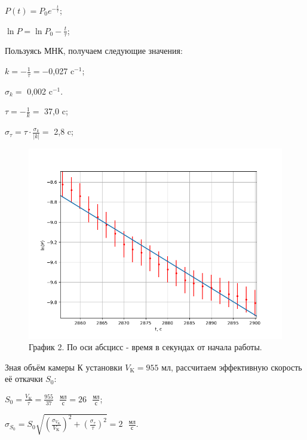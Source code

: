 \documentclass[a4paper,12pt]{article} %
\begin{document}
\begin{enumerate}
	$P(t) = P_{0}e^{-\frac{t}{\tau}}$;

	$\ln{P} = \ln{P_{0}} - \frac{t}{\tau}$;

	Пользуясь МНК, получаем следующие значения:

	$k = -\frac{1}{\tau} = -$0,027 c$^{-1}$;

	$\sigma_{k} = $ 0,002 c$^{-1}$.

	\vspace{5mm}
	$\tau = -\frac{1}{k} = $ 37,0 c;

	$\sigma_{\tau} = \tau \cdot \frac{\sigma_{k}}{|k|} = $ 2,8 c;

	\begin{center}
	\end{center}

\newpage
\begin{figure}[h!]
	\centering
	\includegraphics[scale=0.8]{lnP(t) ТМН.png}
	\caption*{График 2. По оси абсцисс - время в секундах от начала работы.}
\end{figure}


Зная объём камеры К установки $V_{\text{K}} = 955$ мл, рассчитаем эффективную скорость её откачки $S_{0}$:

$S_{0} = \frac{V_{\text{K}}}{\tau} = \frac{955}{37}\text{ }\frac{\text{мл}}{\text{с}} = 26\text{ }\frac{\text{мл}}{\text{с}}$;

$\sigma_{S_{0}} = S_{0}\sqrt{\left(\frac{\sigma_{V_{\text{K}}}}{V_{\text{K}}}\right)^2 + \left(\frac{\sigma_{\tau}}{\tau}\right)^2} = 2\text{ }\frac{\text{мл}}{\text{с}}$.

\begin{center}
\end{center}



\end{enumerate}
\end{document}
